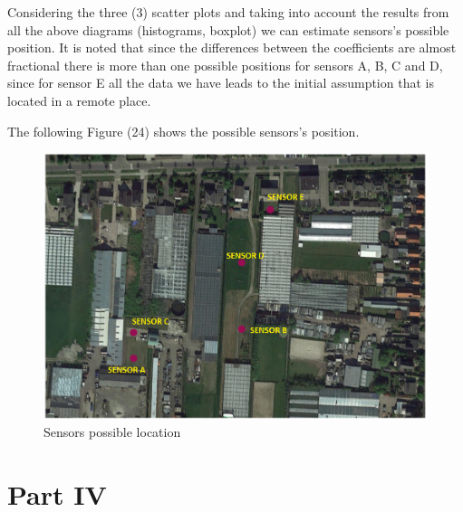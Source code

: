 \documentclass[a4paper]{article}
\begin{document}
            Considering the three (3) scatter plots and taking into account the results from all the above diagrams (histograms, boxplot) we can estimate sensors’s possible position. It is noted that since the differences between the coefficients are almost fractional there is more than one possible positions for sensors A, B, C and D, since for sensor E all the data we have leads to the initial assumption that is located in a remote place.
            
            The following Figure (24) shows the possible sensors's position.
            \begin{figure}[H]
            \centering
                \includegraphics[width=\textwidth]{images/sensors.PNG}
                \caption{Sensors possible location}
                \label{fig:Possible Location}
            \end{figure}
           
\section{Part IV}
\end{document}

